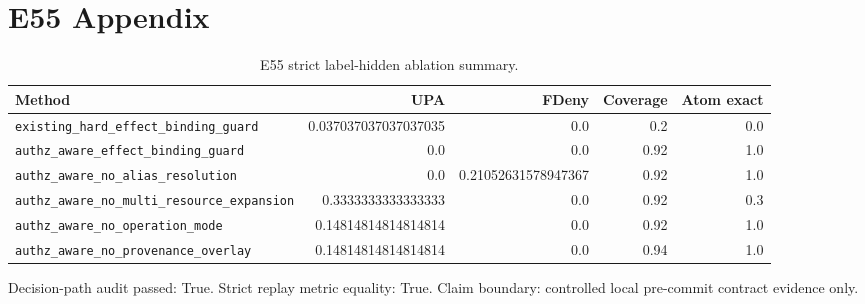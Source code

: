 \section{E55 Appendix}
\begin{table}[h]
\centering
\small
\begin{tabular}{lrrrr}
\toprule
Method & UPA & FDeny & Coverage & Atom exact \\
\midrule
\texttt{existing\_hard\_effect\_binding\_guard} & 0.037037037037037035 & 0.0 & 0.2 & 0.0 \\
\texttt{authz\_aware\_effect\_binding\_guard} & 0.0 & 0.0 & 0.92 & 1.0 \\
\texttt{authz\_aware\_no\_alias\_resolution} & 0.0 & 0.21052631578947367 & 0.92 & 1.0 \\
\texttt{authz\_aware\_no\_multi\_resource\_expansion} & 0.3333333333333333 & 0.0 & 0.92 & 0.3 \\
\texttt{authz\_aware\_no\_operation\_mode} & 0.14814814814814814 & 0.0 & 0.92 & 1.0 \\
\texttt{authz\_aware\_no\_provenance\_overlay} & 0.14814814814814814 & 0.0 & 0.94 & 1.0 \\
\bottomrule
\end{tabular}
\caption{E55 strict label-hidden ablation summary.}
\end{table}

Decision-path audit passed: True. Strict replay metric equality: True. Claim boundary: controlled local pre-commit contract evidence only.
